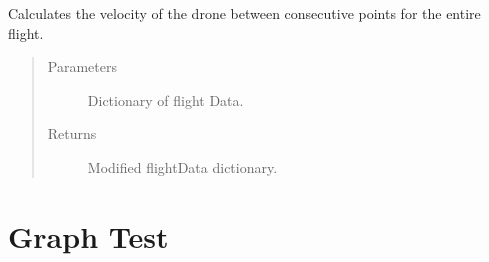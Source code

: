 \documentclass[letterpaper,10pt,english]{sphinxmanual}
\begin{document}

\begin{fulllineitems}
\label{\detokenize{index:src.Views.Graph.velocityPoints}}
Calculates the velocity of the drone between consecutive points for the entire flight.
\begin{quote}\begin{description}
\item[{Parameters}] \leavevmode
{} \textendash{} Dictionary of flight Data.

\item[{Returns}] \leavevmode
Modified flightData dictionary.

\end{description}\end{quote}

\end{fulllineitems}



\chapter{Graph Test}
\label{\detokenize{index:module-src.Tests.Graph_Test}}\label{\detokenize{index:graph-test}}
\end{document}
